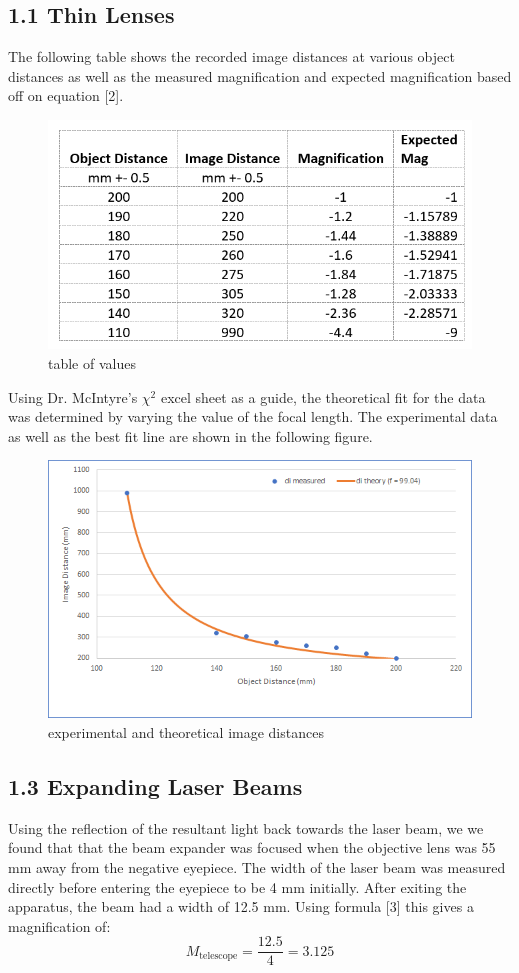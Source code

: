 \documentclass[letter, 11pt, onecolumn]{article}
\begin{document}
		\subsection*{1.1 Thin Lenses}
		The following table shows the recorded image distances at various object distances as well as the measured magnification and expected magnification based off on equation [2]. \\
			\begin{figure}[h!]
				\centering
				\includegraphics[width = 0.6\columnwidth]{table1}
				\caption{table of values}
			\end{figure} 
		
		\noindent Using Dr. McIntyre's $\chi^2$ excel sheet as a guide, the theoretical fit for the data was determined by varying the value of the focal length. The experimental data as well as the best fit line are shown in the following figure. 
			\begin{figure}[h!]
				\centering
				\includegraphics[width=0.75\columnwidth]{graph1}
				\caption{experimental and theoretical image distances}
			\end{figure}
		
		\subsection*{1.3 Expanding Laser Beams}
		Using the reflection of the resultant light back towards the laser beam, we we found that that the beam expander was focused when the objective lens was 55 mm away from the negative eyepiece. The width of the laser beam was measured directly before entering the eyepiece to be 4 mm initially. After exiting the apparatus, the beam had a width of 12.5 mm. Using formula [3] this gives a magnification of:
			\begin{equation}
				M_{\text{telescope}}=\frac{12.5}{4} = 3.125
			\end{equation}
		
\end{document}
